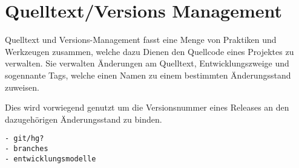 \section{Quelltext/Versions Management}
\label{sec:base:scm}


Quelltext und Versions-Management fasst eine Menge
von Praktiken und Werkzeugen zusammen,
welche dazu Dienen den Quellcode eines Projektes zu verwalten.
Sie verwalten \"Anderungen am Quelltext, Entwicklungszweige und sogennante Tags,
welche einen Namen zu einem bestimmten \"Anderungsstand zuweisen.

Dies wird vorwiegend genutzt um die Versionsnummer eines Releases an den dazugeh\"origen \"Anderungsstand zu binden.



\begin{verbatim}
- git/hg?
- branches
- entwicklungsmodelle
\end{verbatim}
